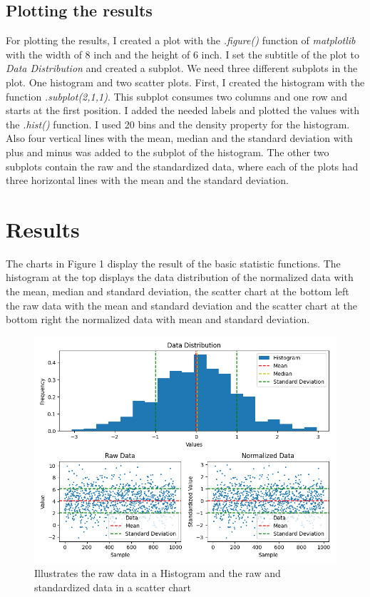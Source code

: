 \documentclass[10pt, a4paper, twocolumn]{article} %
\begin{document}
\subsection{Plotting the results}
For plotting the results, I created a plot with the \textit{.figure()} function of \textit{matplotlib} with the width of 8 inch and the height of 6 inch. I set the subtitle of the plot to \textit{Data Distribution} and created a subplot. We need three different subplots in the plot. One histogram and two scatter plots. 
First, I created the histogram with the function  \textit{.subplot(2,1,1)}. This subplot consumes two columns and one row and starts at the first position. I added the needed labels and plotted the values with the \textit{.hist()} function. I used 20 bins and the density property for the histogram. Also four vertical lines with the mean, median and the standard deviation with plus and minus was added to the subplot of the histogram. 
The other two subplots contain the raw and the standardized data, where each of the plots had three horizontal lines with the mean and the standard deviation. 

\section{Results}
The charts in Figure 1 display the result of the basic statistic functions. The histogram at the top displays the data distribution of the normalized data with the mean, median and standard deviation, the scatter chart at the bottom left the raw data with the mean and standard deviation and the scatter chart at the bottom right the normalized data with mean and standard deviation. 

\begin{figure}[htbp] %
  \centering
  \includegraphics[width=\columnwidth]{pics/result.png}
  \caption{Illustrates the raw data in a Histogram and the raw and standardized data in a scatter chart}
  \label{fig:fibonacciPlot}
\end{figure}
\end{document}
